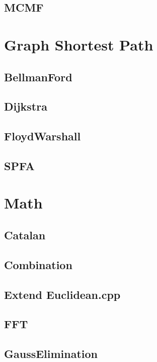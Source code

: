 \subsection{MCMF}


\section{Graph Shortest Path}

\subsection{BellmanFord}

\subsection{Dijkstra}

\subsection{FloydWarshall}

\subsection{SPFA}


\section{Math}

\subsection{Catalan}

\subsection{Combination}

\subsection{Extend Euclidean.cpp}

\subsection{FFT}

\subsection{GaussElimination}

